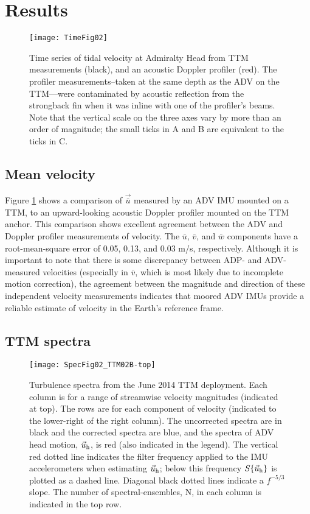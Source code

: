 \section{Results}
\label{sec:results}

\begin{figure}[t]
  \centering
  \texttt{[image: TimeFig02]}
  \caption{Time series of tidal velocity at Admiralty Head from TTM measurements (black), and an acoustic Doppler profiler (red). The profiler measurements--taken at the same depth as the ADV on the TTM---were contaminated by acoustic reflection from the strongback fin when it was inline with one of the profiler's beams. Note that the vertical scale on the three axes vary by more than an order of magnitude; the small ticks in A and B are equivalent to the ticks in C.}
  \label{fig:vel_time}
\end{figure}

\subsection{Mean velocity}

Figure \ref{fig:vel_time} shows a comparison of $\vec{\bar u}$ measured by an ADV IMU mounted on a TTM, to an upward-looking acoustic Doppler profiler mounted on the TTM anchor. This comparison shows excellent agreement between the ADV and Doppler profiler measurements of velocity. The $\bar u$, $\bar v$, and $\bar w$ components have a root-mean-square error of 0.05, 0.13, and 0.03 m/s, respectively.
Although it is important to note that there is some discrepancy between ADP- and ADV-measured velocities (especially in $\bar v$, which is most likely due to incomplete motion correction), the agreement between the magnitude and direction of these independent velocity measurements indicates that moored ADV IMUs provide a reliable estimate of velocity in the Earth's reference frame.

\subsection{TTM spectra}

\begin{figure*}[t]
  \centering
  \texttt{[image: SpecFig02\_TTM02B-top]}
  \caption{Turbulence spectra from the June 2014 TTM deployment. Each column is for a range of streamwise velocity magnitudes (indicated at top). The rows are for each component of velocity (indicated to the lower-right of the right column). The uncorrected spectra are in black and the corrected spectra are blue, and the spectra of ADV head motion, $\vec{u}_\mathrm{h}$, is red (also indicated in the legend). The vertical red dotted line indicates the filter frequency applied to the IMU accelerometers when estimating $\vec{u}_\mathrm{h}$; below this frequency $S\{\vec{u}_\mathrm{h}\}$ is plotted as a dashed line.   Diagonal black dotted lines indicate a $f^{-5/3}$ slope. The number of spectral-ensembles, N, in each column is indicated in the top row.}
  \label{fig:spec:ttm}
\end{figure*}

